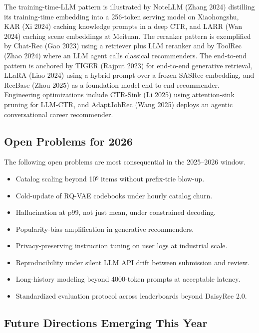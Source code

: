 The training-time-LLM pattern is illustrated by NoteLLM (Zhang 2024) distilling its training-time embedding into a 256-token serving model on Xiaohongshu, KAR (Xi 2024) caching knowledge prompts in a deep CTR, and LARR (Wan 2024) caching scene embeddings at Meituan. The reranker pattern is exemplified by Chat-Rec (Gao 2023) using a retriever plus LLM reranker and by ToolRec (Zhao 2024) where an LLM agent calls classical recommenders. The end-to-end pattern is anchored by TIGER (Rajput 2023) for end-to-end generative retrieval, LLaRA (Liao 2024) using a hybrid prompt over a frozen SASRec embedding, and RecBase (Zhou 2025) as a foundation-model end-to-end recommender. Engineering optimizations include CTR-Sink (Li 2025) using attention-sink pruning for LLM-CTR, and AdaptJobRec (Wang 2025) deploys an agentic conversational career recommender.

\subsection{Open Problems for 2026}\label{open-problems-for-2026}

The following open problems are most consequential in the 2025--2026 window.

\begin{itemize}
\tightlist
\item
  Catalog scaling beyond 10⁹ items without prefix-trie blow-up.
\item
  Cold-update of RQ-VAE codebooks under hourly catalog churn.
\item
  Hallucination at p99, not just mean, under constrained decoding.
\item
  Popularity-bias amplification in generative recommenders.
\item
  Privacy-preserving instruction tuning on user logs at industrial scale.
\item
  Reproducibility under silent LLM API drift between submission and review.
\item
  Long-history modeling beyond 4000-token prompts at acceptable latency.
\item
  Standardized evaluation protocol across leaderboards beyond DaisyRec 2.0.
\end{itemize}

\subsection{Future Directions Emerging This Year}\label{future-directions-emerging-this-year}

